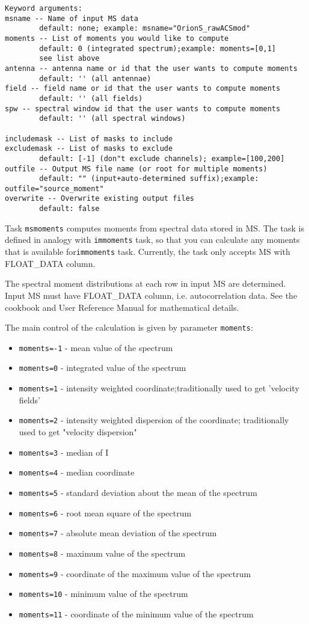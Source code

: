 \begin{verbatim}
Keyword arguments:
msname -- Name of input MS data
        default: none; example: msname="OrionS_rawACSmod"
moments -- List of moments you would like to compute
        default: 0 (integrated spectrum);example: moments=[0,1]
        see list above
antenna -- antenna name or id that the user wants to compute moments
        default: '' (all antennae)
field -- field name or id that the user wants to compute moments
        default: '' (all fields)
spw -- spectral window id that the user wants to compute moments
        default: '' (all spectral windows)

includemask -- List of masks to include
excludemask -- List of masks to exclude
        default: [-1] (don"t exclude channels); example=[100,200]
outfile -- Output MS file name (or root for multiple moments)
        default: "" (input+auto-determined suffix);example: outfile="source_moment"
overwrite -- Overwrite existing output files
        default: false
\end{verbatim}

Task {\tt msmoments} computes moments from spectral data stored
in MS. The task is defined in analogy with {\tt immoments} task,
so that you can calculate any moments that is available
for{\tt  immoments} task. Currently, the task only accepts MS
with FLOAT\_DATA column.

The spectral moment distributions at each row in input MS are
determined. Input MS must have FLOAT\_DATA column, i.e. 
autocorrelation data.  
See the cookbook and User Reference Manual for
mathematical details.

The main control of the calculation is given by parameter {\tt moments}:
        
\begin{itemize}
   \item {\tt moments=-1} - mean value of the spectrum
   \item {\tt moments=0}  - integrated value of the spectrum
   \item {\tt moments=1}  - intensity weighted coordinate;traditionally used to get 'velocity fields'
   \item {\tt moments=2}  - intensity weighted dispersion of the coordinate; traditionally used to get "velocity dispersion"
   \item {\tt moments=3}  - median of I
   \item {\tt moments=4}  - median coordinate
   \item {\tt moments=5}  - standard deviation about the mean of the spectrum
   \item {\tt moments=6}  - root mean square of the spectrum
   \item {\tt moments=7}  - absolute mean deviation of the spectrum
   \item {\tt moments=8}  - maximum value of the spectrum
   \item {\tt moments=9}  - coordinate of the maximum value of the spectrum
   \item {\tt moments=10} - minimum value of the spectrum
   \item {\tt moments=11} - coordinate of the minimum value of the spectrum
\end{itemize}

